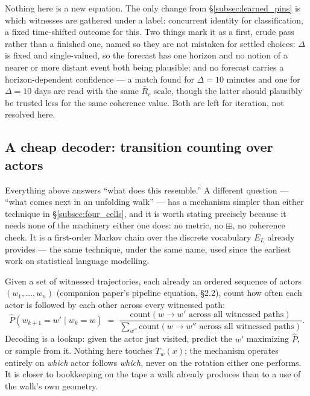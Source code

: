 \documentclass[12pt, a4paper]{article}
\begin{document}
Nothing here is a new equation. The only change from
\S\ref{subsec:learned_pins} is which witnesses are gathered under a
label: concurrent identity for classification, a fixed time-shifted
outcome for this. Two things mark it as a first, crude pass rather
than a finished one, named so they are not mistaken for settled
choices: $\Delta$ is fixed and single-valued, so the forecast has one
horizon and no notion of a nearer or more distant event both being
plausible; and no forecast carries a horizon-dependent confidence ---
a match found for $\Delta=10$ minutes and one for $\Delta=10$ days are
read with the same $\bar R_c$ scale, though the latter should
plausibly be trusted less for the same coherence value. Both are left
for iteration, not resolved here.

\subsection{A cheap decoder: transition counting over actors}
\label{subsec:markov_decoder}

Everything above answers ``what does this resemble.'' A different
question --- ``what comes next in an unfolding walk'' --- has a
mechanism simpler than either technique in
\S\ref{subsec:four_cells}, and it is worth stating precisely because
it needs none of the machinery either one does: no metric, no
$\boxplus$, no coherence check. It is a first-order Markov chain over
the discrete vocabulary $E_L$ already provides --- the same technique,
under the same name, used since the earliest work on statistical
language modelling.

Given a set of witnessed trajectories, each already an ordered
sequence of actors $(w_1,\ldots,w_n)$ (companion paper's
pipeline equation, \S2.2), count how often each actor is followed
by each other across every witnessed path:
\begin{equation}
    \widehat{P}(w_{k+1}=w' \mid w_k=w)
    \;=\;
    \frac{\mathrm{count}(w\to w' \text{ across all witnessed paths})}
         {\sum_{w''}\mathrm{count}(w\to w'' \text{ across all witnessed paths})}.
    \label{eq:markov}
\end{equation}
Decoding is a lookup: given the actor just visited, predict the $w'$
maximizing $\widehat P$, or sample from it. Nothing here touches
$T_w(x)$; the mechanism operates entirely on \emph{which} actor
follows \emph{which}, never on the rotation either one performs. It
is closer to bookkeeping on the tape a walk already produces than to
a use of the walk's own geometry.
\end{document}
